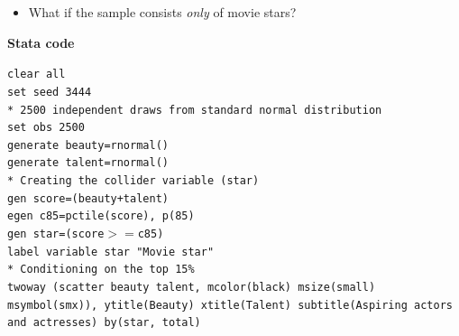 \documentclass[notes=show]{beamer}
\begin{document}
\begin{frame}[plain]

\begin{itemize}
	\item What if the sample consists \emph{only} of movie stars?
\end{itemize}	

	\begin{center}
			\end{center}




\end{frame}

\begin{frame}[plain]
	\begin{center}
	\textbf{Stata code}
	\end{center}

\scriptsize{
\texttt{clear all \\
set seed 3444 \\
\bigskip
* 2500 independent draws from standard normal distribution \\
set obs 2500 \\
generate beauty=rnormal() \\
generate talent=rnormal() \\
\bigskip
* Creating the collider variable (star) \\
gen score=(beauty+talent) \\
egen c85=pctile(score), p(85)   \\
gen star=(score$>=$c85) \\
label variable star "Movie star" \\
\bigskip
* Conditioning on the top 15\% \\
twoway (scatter beauty talent, mcolor(black) msize(small) msymbol(smx)), ytitle(Beauty) xtitle(Talent) subtitle(Aspiring actors and actresses) by(star, total)}}

		\framebreak


\end{frame}
\end{document}
